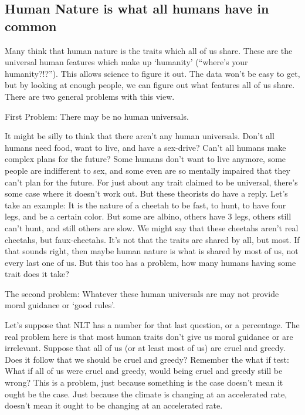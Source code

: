 \subsection{Human Nature is what all humans have in common}

Many think that human nature is the traits which all of us share. These are the universal human features which make up ‘humanity’ (“where’s your humanity?!?”). This allows science to figure it out. The data won’t be easy to get, but by looking at enough people, we can figure out what features all of us share. There are two general problems with this view.

\begin{center}
First Problem: There may be no human universals.
\end{center}

It might be silly to think that there aren’t any human universals. Don’t all humans need food, want to live, and have a sex-drive? Can’t all humans make complex plans for the future? Some humans don’t want to live anymore, some people are indifferent to sex, and some even are so mentally impaired that they can’t plan for the future. For just about any trait claimed to be universal, there’s some case where it doesn’t work out. But these theorists do have a reply. Let’s take an example: It is the nature of a cheetah to be fast, to hunt, to have four legs, and be a certain color. But some are albino, others have 3 legs, others still can’t hunt, and still others are slow. We might say that these cheetahs aren’t real cheetahs, but faux-cheetahs. It’s not that the traits are shared by all, but most. If that sounds right, then maybe human nature is what is shared by most of us, not every last one of us. But this too has a problem, how many humans having some trait does it take? 

\begin{center}
The second problem: Whatever these human universals are may not provide moral guidance or ‘good rules’.
\end{center}

Let’s suppose that NLT has a number for that last question, or a percentage. The real problem here is that most human traits don’t give us moral guidance or are irrelevant. Suppose that all of us (or at least most of us) are cruel and greedy. Does it follow that we should be cruel and greedy? Remember the what if test: What if all of us were cruel and greedy, would being cruel and greedy still be wrong? This is a problem, just because something is the case doesn’t mean it ought be the case. Just because the climate is changing at an accelerated rate, doesn’t mean it ought to be changing at an accelerated rate.

